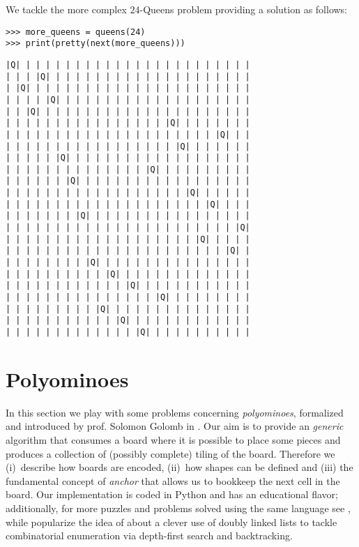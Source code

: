\begin{example}
We tackle the more complex $24$-Queens problem providing a
solution as follows:
\begin{verbatim}
>>> more_queens = queens(24)
>>> print(pretty(next(more_queens)))
\end{verbatim}
\begin{Verbatim}[baselinestretch=0.1, fontsize=\small]
|Q| | | | | | | | | | | | | | | | | | | | | | | |
| | | |Q| | | | | | | | | | | | | | | | | | | | |
| |Q| | | | | | | | | | | | | | | | | | | | | | |
| | | | |Q| | | | | | | | | | | | | | | | | | | |
| | |Q| | | | | | | | | | | | | | | | | | | | | |
| | | | | | | | | | | | | | | | |Q| | | | | | | |
| | | | | | | | | | | | | | | | | | | | | |Q| | |
| | | | | | | | | | | | | | | | | |Q| | | | | | |
| | | | | |Q| | | | | | | | | | | | | | | | | | |
| | | | | | | | | | | | | | |Q| | | | | | | | | |
| | | | | | |Q| | | | | | | | | | | | | | | | | |
| | | | | | | | | | | | | | | | | | |Q| | | | | |
| | | | | | | | | | | | | | | | | | | | |Q| | | |
| | | | | | | |Q| | | | | | | | | | | | | | | | |
| | | | | | | | | | | | | | | | | | | | | | | |Q|
| | | | | | | | | | | | | | | | | | | |Q| | | | |
| | | | | | | | | | | | | | | | | | | | | | |Q| |
| | | | | | | | |Q| | | | | | | | | | | | | | | |
| | | | | | | | | | |Q| | | | | | | | | | | | | |
| | | | | | | | | | | | |Q| | | | | | | | | | | |
| | | | | | | | | | | | | | | |Q| | | | | | | | |
| | | | | | | | | |Q| | | | | | | | | | | | | | |
| | | | | | | | | | | |Q| | | | | | | | | | | | |
| | | | | | | | | | | | | |Q| | | | | | | | | | |
\end{Verbatim}
\end{example}

\section{Polyominoes}

In this section we play with some problems concerning \textit{polyominoes},
formalized and introduced by prof. Solomon Golomb in \citep{Golomb:1996}.  Our
aim is to provide an \textit{generic} algorithm that consumes a board where it
is possible to place some pieces and produces a collection of (possibly
complete) tiling of the board. Therefore we (i)~describe how boards are
encoded, (ii)~how shapes can be defined and (iii) the fundamental concept of
\textit{anchor} that allows us to bookkeep the next  cell in the
board. Our implementation is coded in Python and has an educational flavor;
additionally, for more puzzles and problems solved using the same language see
\citep{Goodger:polyominoes}, while \citep{knuth:dancing:links} popularize the
idea of \citep{HITOTUMATU1979174} about a clever use of doubly linked lists to
tackle combinatorial enumeration via depth-first search and backtracking.

